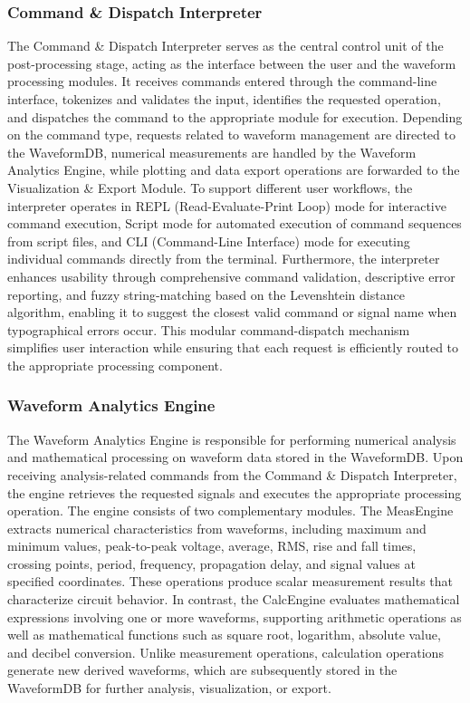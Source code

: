 \subsubsection{Command \& Dispatch Interpreter}
The Command \& Dispatch Interpreter serves as the central control unit of the post-processing stage, acting as the interface between the user and the waveform processing modules. It receives commands entered through the command-line interface, tokenizes and validates the input, identifies the requested operation, and dispatches the command to the appropriate module for execution. Depending on the command type, requests related to waveform management are directed to the WaveformDB, numerical measurements are handled by the Waveform Analytics Engine, while plotting and data export operations are forwarded to the Visualization \& Export Module. To support different user workflows, the interpreter operates in REPL (Read-Evaluate-Print Loop) mode for interactive command execution, Script mode for automated execution of command sequences from script files, and CLI (Command-Line Interface) mode for executing individual commands directly from the terminal. Furthermore, the interpreter enhances usability through comprehensive command validation, descriptive error reporting, and fuzzy string-matching based on the Levenshtein distance algorithm, enabling it to suggest the closest valid command or signal name when typographical errors occur. This modular command-dispatch mechanism simplifies user interaction while ensuring that each request is efficiently routed to the appropriate processing component.


\subsubsection{Waveform Analytics Engine}
The Waveform Analytics Engine is responsible for performing numerical analysis and mathematical processing on waveform data stored in the WaveformDB. Upon receiving analysis-related commands from the Command \& Dispatch Interpreter, the engine retrieves the requested signals and executes the appropriate processing operation. The engine consists of two complementary modules. The MeasEngine extracts numerical characteristics from waveforms, including maximum and minimum values, peak-to-peak voltage, average, RMS, rise and fall times, crossing points, period, frequency, propagation delay, and signal values at specified coordinates. These operations produce scalar measurement results that characterize circuit behavior. In contrast, the CalcEngine evaluates mathematical expressions involving one or more waveforms, supporting arithmetic operations as well as mathematical functions such as square root, logarithm, absolute value, and decibel conversion. Unlike measurement operations, calculation operations generate new derived waveforms, which are subsequently stored in the WaveformDB for further analysis, visualization, or export.


